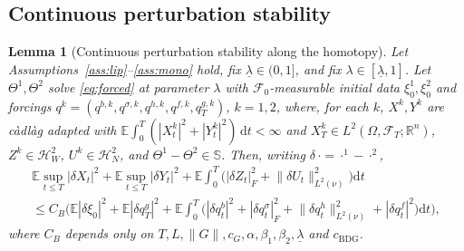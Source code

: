 \documentclass[preprint,12pt]{elsarticle}
\newcommand{\R}{\mathbb{R}}
\newcommand{\E}{\mathbb{E}}
\newcommand{\F}{\mathcal{F}}
\newcommand{\diff}{\mathrm{d}}
\newcommand{\Lnu}{L^2(\nu)}
\newcommand{\HH}{\mathbb{S}}
\newcommand{\HW}{\mathcal{H}^2_W}
\newcommand{\HN}{\mathcal{H}^2_N}
\newcommand{\Lnorm}[1]{\lVert #1\rVert_{\Lnu}}
\numberwithin{equation}{section}
\theoremstyle{plain}
\newtheorem{lemma}[theorem]{Lemma}
\theoremstyle{definition}
\theoremstyle{\PaperRemarkStyle}
\begin{document}
\subsection{Continuous perturbation stability}

\begin{lemma}[Continuous perturbation stability along the homotopy]\label{lem:pert}
Let Assumptions~\ref{ass:lip}--\ref{ass:mono} hold, fix $\underline\lambda\in(0,1]$, and
fix $\lambda\in[\underline\lambda,1]$. Let
$\Theta^1,\Theta^2$ solve \eqref{eq:forced} at parameter $\lambda$ with $\F_0$-measurable
initial data $\xi_0^1,\xi_0^2$ and forcings
$q^k=(q^{b,k},q^{\sigma,k},q^{h,k},q^{f,k},q^{g,k}_T)$, $k=1,2$, where, for each $k$,
$X^k,Y^k$ are c\`adl\`ag adapted with
$\E\int_0^T(|X^k_t|^2+|Y^k_t|^2)\,\diff t<\infty$ and $X^k_T\in L^2(\Omega,\F_T;\R^n)$,
$Z^k\in\HW$, $U^k\in\HN$, and $\Theta^1-\Theta^2\in\HH$. Then, writing
$\delta\,{\cdot}={\cdot}^1-{\cdot}^2$,
\begin{multline}\label{eq:contpert}
\E\sup_{t\le T}|\delta X_t|^2+\E\sup_{t\le T}|\delta Y_t|^2
+\E\!\int_0^T\!\big(|\delta Z_t|_F^2+\Lnorm{\delta U_t}^2\big)\diff t\\
\le C_B\Big(\E|\delta\xi_0|^2+\E|\delta q^g_T|^2
+\E\!\int_0^T\!\big(|\delta q^b_t|^2+|\delta q^\sigma_t|_F^2
+\Lnorm{\delta q^h_t}^2+|\delta q^f_t|^2\big)\diff t\Big),
\end{multline}
where $C_B$ depends only on
$T,L,\|G\|,c_G,\alpha,\beta_1,\beta_2,\underline\lambda$ and $c_{\mathrm{BDG}}$.
\end{lemma}
\end{document}
